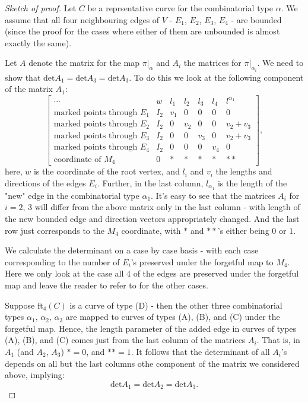 \begin{proof}[Sketch of proof]
    \par Let $C$ be a reprsentative curve for the combinatorial type $\alpha$.
    We assume that all four neighbouring edges of $V$ - $E_{1}$, $E_{2}$, $E_{3}$, $E_{4}$ - are bounded (since the proof for the cases where either of them are unbounded is almost exactly the same). 
    \par Let $A$ denote the matrix for the map $\pi|_{\alpha}$ and $A_{i}$ the matrices for $\pi|_{\alpha_{i}}$.
    We need to show that $\text{det}A_{1} = \text{det}A_{3} =\text{det}A_{3}$.
    To do this we look at the following component of the matrix $A_{1}$:
    \[
        \begin{bmatrix}
            \cdots & w & l_{1} & l_{2} & l_{3} & l_{4} & l^{\alpha_{1}}\\
            \text{marked points through $E_{1}$} & I_{2} & v_{1} & 0 & 0 & 0 & 0\\
            \text{marked points through $E_{2}$} & I_{2} & 0 & v_{2} & 0 & 0 & v_{2} + v_{3}\\
            \text{marked points through $E_{3}$} & I_{2} & 0 & 0 & v_{3} & 0 & v_{2} + v_{3}\\
            \text{marked points through $E_{4}$} & I_{2} & 0 & 0 & 0 & v_{4} & 0\\
            \text{coordinate of }M_{4} & 0 & * & * & * & * & **
        \end{bmatrix},
    \]
    here, $w$ is the coordinate of the root vertex, and $l_{i}$ and $v_{i}$ the lengths and directions of the edges $E_{i}$. Further, in the last column, $l_{\alpha_{1}}$ is the length of the "new" edge in the combinatorial type $\alpha_{1}$.
    It's easy to see that the matrices $A_{i}$ for $i =2,\,3$ will differ from the above matrix only in the last column - with length of the new bounded edge and direction vectors appropriately changed.
    And the last row just corresponds to the $M_{4}$ coordinate, with $*$ and $**$'s either being $0$ or $1$.
    \par We calculate the determinant on a case by case basis - with each case corresponding to the number of $E_{i}$'s preserved under the forgetful map to $M_{4}$. 
    Here we only look at the case all $4$ of the edges are preserved under the forgetful map and leave the reader to refer to \cite{GATHMANNwdvv} for the other cases.
    \par Suppose $\text{ft}_{4}(C)$ is a curve of type (D) - then the other three combinatorial types $\alpha_{1},\, \alpha_{2},\,\alpha_{3}$ are mapped to curves of types (A), (B), and (C) under the forgetful map.
    Hence, the length parameter of the added edge in curves of types (A), (B), and (C) comes just from the last column of the matrices $A_{i}$.
    That is, in $A_{1}$ (and $A_{2}$, $A_{3}$) $* = 0$, and $** = 1$.
    It follows that the determinant of all $A_{i}$'s depends on all but the last columns othe component of the matrix we considered above, implying:
    \[
        \text{det}A_{1} = \text{det}A_{2} =\text{det}A_{3}.
    \]
\end{proof}



